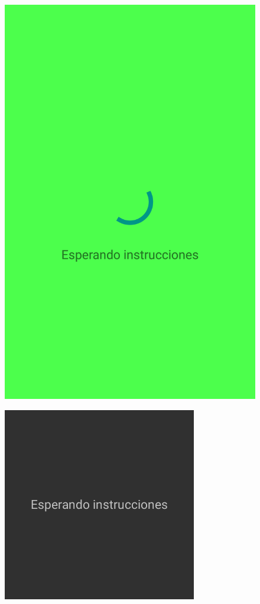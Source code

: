 \begin{slide}
\begin{center}
\begin{minipage}[b]{0.3\linewidth}
\begin{center}
\begin{figure}
          \includegraphics[height=0.65\textheight]{img/navigantobluetooth-esperando.png}
        \end{figure}
      \end{center}
    \end{minipage}
    \begin{minipage}[b]{0.3\linewidth}
      \begin{center}
        \begin{figure}
          \includegraphics[height=0.35\textheight]{img/navigantowear-esperando.png}

\end{figure}
\end{center}
\end{minipage}
\end{center}
\end{slide}
